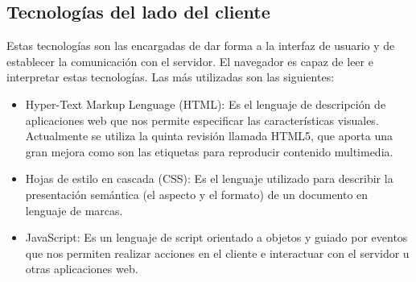 \subsection{Tecnologías del lado del cliente}
Estas tecnologías son las encargadas de dar forma a la interfaz de usuario y de establecer la comunicación con el servidor. El navegador es capaz de leer e interpretar estas tecnologías. Las más utilizadas son las siguientes:
\begin{itemize}
	\item Hyper-Text Markup Lenguage (HTML): Es el lenguaje de descripción de aplicaciones web que nos permite especificar las características visuales. Actualmente se utiliza la quinta revisión llamada HTML5, que aporta una gran mejora como son las etiquetas para reproducir contenido multimedia.
	\item Hojas de estilo en cascada (CSS): Es el lenguaje utilizado para describir la presentación semántica (el aspecto y el formato) de un documento en lenguaje de marcas.
	\item JavaScript: Es un lenguaje de script orientado a objetos y guiado por eventos que nos permiten realizar acciones en el cliente e interactuar con el servidor u otras aplicaciones web.
\end{itemize}

